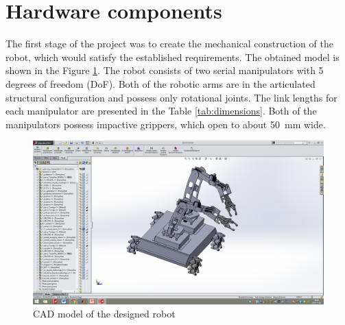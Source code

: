 \section{Hardware components}
\label{sec:hard}

The first stage of the project was to create the mechanical construction of the robot, which would satisfy the established requirements. The obtained model is shown in the Figure \ref{fig:model}.  The robot consists of two serial manipulators with 5 degrees of freedom (DoF). Both of the robotic arms are in the articulated structural configuration and possess only rotational joints. The link lengths for each manipulator are presented in the Table \ref{tab:dimensions}. Both of the manipulators possess impactive grippers, which open to about \SI{50}{\milli\meter} wide.


\begin{figure}[H]
\centering
\includegraphics[trim=21cm 5cm 18cm 5cm, clip=true, totalheight=0.3\textheight]{fig/model}
\caption{CAD model of the designed robot}
\label{fig:model}
\end{figure}


